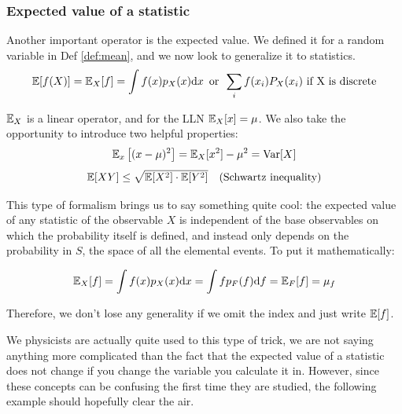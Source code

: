\subsubsection{Expected value of a statistic}
Another important operator is the expected value. We defined it for a random variable in Def \ref{def:mean}, and we now look to generalize it to statistics.
	\[
	\mathbb{E}[f(X)] = \mathbb{E}_X[f] = \int f(x)p_X(x)\mathrm{d} x \,\,\, \text{or} \,\,\, \sum_i f(x_i)P_X(x_i) \,\, \text{if X is discrete}
	\]
	
$\mathbb{E}_X$ is a linear operator, and for the LLN $\mathbb{E}_X[x]=\mu$. We also take the opportunity to introduce two helpful properties:
	\[
	\mathbb{E}_x\left[ (x-\mu)^2 \right] = \mathbb{E}_X[x^2] - \mu^2 = \operatorname{Var}[X]
	\]
	\[
	\mathbb{E}[XY]\leq\sqrt{\mathbb{E}[X^2]\cdot\mathbb{E}[Y^2]} \quad \text{(Schwartz inequality)}
	\]

This type of formalism brings us to say something quite cool: the expected value of any statistic of the observable $X$ is independent of the base observables on which the probability itself is defined, and instead only depends on the probability in $S$, the space of all the elemental events. To put it mathematically:

	\[
	\mathbb{E}_X[f] = \int f(x)p_X(x)\mathrm{d} x = \int fp_F(f)\mathrm{d} f = \mathbb{E}_F[f] = \mu_f
	\]

Therefore, we don't lose any generality if we omit the index and just write $\mathbb{E}[f]$.


We physicists are actually quite used to this type of trick, we are not saying anything more complicated than the fact that the expected value of a statistic does not change if you change the variable you calculate it in. However, since these concepts can be confusing the first time they are studied, the following example should hopefully clear the air. 

